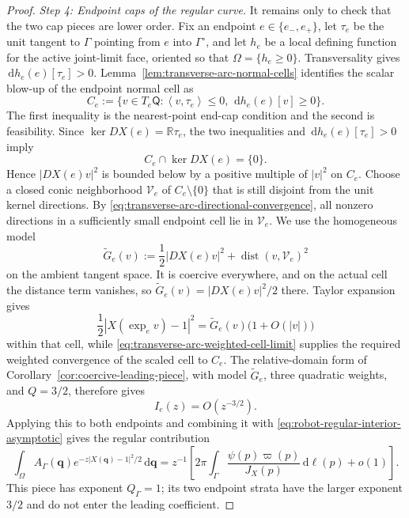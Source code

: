 \documentclass[10pt,a4paper]{amsart}
\DeclareMathOperator{\dist}{dist}
\newcommand{\R}{\mathbb{R}}
\newcommand{\dd}{\,\mathrm{d}}
\newcommand{\inner}[2]{\left\langle #1,#2\right\rangle}
\begin{document}
\begin{proof}
\smallskip
\noindent\emph{Step 4: Endpoint caps of the regular curve.}
It remains only to check that the two cap pieces are lower order.  Fix an
endpoint $e\in\{e_-,e_+\}$, let $\tau_e$ be the unit tangent to $\Gamma$
pointing from $e$ into $\Gamma^\circ$, and let $h_e$ be a local defining
function for the active joint-limit face, oriented so that
$\Omega=\{h_e\ge0\}$.  Transversality gives
$\dd h_e(e)[\tau_e]>0$.  Lemma~\ref{lem:transverse-arc-normal-cells} identifies the scalar blow-up of
the endpoint normal cell as
\begin{equation}\label{eq:robot-endpoint-cone}
 C_e:=\{v\in T_e\mathsf Q:
       \inner{v}{\tau_e}\le0,\ \dd h_e(e)[v]\ge0\}.
\end{equation}
The first inequality is the nearest-point end-cap condition and the second is
feasibility.  Since $\ker DX(e)=\R\tau_e$, the two inequalities and
$\dd h_e(e)[\tau_e]>0$ imply
\[
 C_e\cap\ker DX(e)=\{0\}.
\]
Hence $|DX(e)v|^2$ is bounded below by a positive multiple of $|v|^2$ on
$C_e$.  Choose a closed conic neighborhood $\mathcal V_e$ of $C_e\setminus\{0\}$ that
is still disjoint from the unit kernel directions.  By
\eqref{eq:transverse-arc-directional-convergence}, all nonzero directions in a
sufficiently small endpoint cell lie in $\mathcal V_e$.  We use the homogeneous model
\[
 \widetilde G_e(v)
 :=\frac12|DX(e)v|^2+\dist(v,\mathcal V_e)^2
\]
on the ambient tangent space.  It is coercive everywhere, and on the actual
cell the distance term vanishes, so $\widetilde G_e(v)=|DX(e)v|^2/2$ there.
Taylor expansion gives
\[
 \frac12|X(\exp_e v)-1|^2
 =\widetilde G_e(v)\bigl(1+O(|v|)\bigr)
\]
within that cell, while
\eqref{eq:transverse-arc-weighted-cell-limit} supplies the required weighted
convergence of the scaled cell to $C_e$.  The relative-domain form of
Corollary~\ref{cor:coercive-leading-piece}, with model
$\widetilde G_e$, three quadratic weights, and $Q=3/2$, therefore gives
\[
 I_e(z)=O(z^{-3/2}).
\]
Applying this to both endpoints and combining it with
\eqref{eq:robot-regular-interior-asymptotic} gives the regular contribution
\begin{equation}\label{eq:robot-regular-asymptotic}
 \int_\Omega A_\Gamma(\bm q)e^{-z|X(\bm q)-1|^2/2}\dd \bm q
 =z^{-1}\left[
 2\pi\int_\Gamma\frac{\psi(p)\varpi(p)}{J_X(p)}\dd\ell(p)
 +o(1)\right].
\end{equation}
This piece has exponent $Q_\Gamma=1$; its two endpoint strata have the larger
exponent $3/2$ and do not enter the leading coefficient.


\end{proof}
\end{document}
